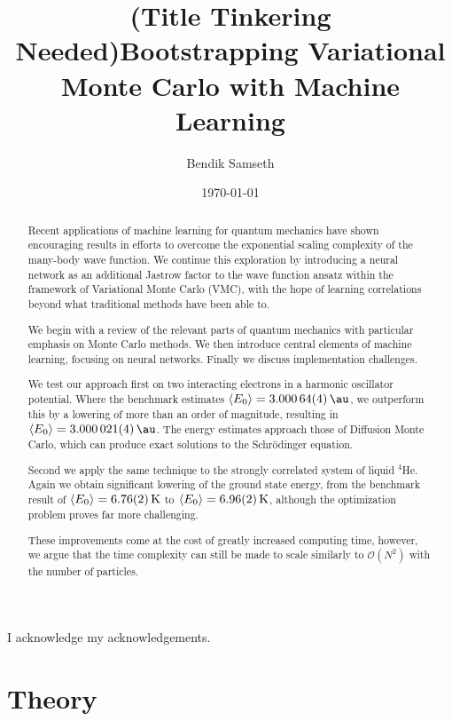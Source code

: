 \documentclass[twoside,english]{uiofysmaster}
\author{Bendik Samseth}
\title{(Title Tinkering Needed)Bootstrapping Variational Monte Carlo with Machine Learning}
\date{\monthyeardate\today}
\begin{document}
\maketitle

\begin{abstract}
Recent applications of machine learning for quantum mechanics have shown
encouraging results in efforts to overcome the exponential scaling complexity of
the many-body wave function. We continue this exploration by introducing a
neural network as an additional Jastrow factor to the wave function ansatz
within the framework of Variational Monte Carlo (VMC), with the hope of learning
correlations beyond what traditional methods have been able to.

We begin with a review of the relevant parts of quantum mechanics with particular
emphasis on Monte Carlo methods. We then introduce central elements of machine
learning, focusing on neural networks. Finally we discuss implementation
challenges.

We test our approach first on two interacting electrons in a harmonic oscillator
potential. Where the benchmark estimates $\expval{E_0}=\SI{3.00064(4)}{\au}$, we
outperform this by a lowering of more than an order of magnitude, resulting in
$\expval{E_0}=\SI{3.000021(4)}{\au}$. The energy estimates approach those of
Diffusion Monte Carlo, which can produce exact solutions to the Schrödinger equation.

Second we apply the same technique to the strongly correlated system of liquid
$^4$He. Again we obtain significant lowering of the ground state energy, from
the benchmark result of $\expval{E_0}=\SI{6.76(2)}{\kelvin}$ to
$\expval{E_0}=\SI{6.96(2)}{\kelvin}$, although the optimization problem proves far
more challenging.

These improvements come at the cost of greatly increased computing time,
however, we argue that the time complexity can still be made to scale similarly to
$\mathcal{O}(N^2)$ with the number of particles.
\end{abstract}

\begin{acknowledgements}
  I acknowledge my acknowledgements.
\end{acknowledgements}

\tableofcontents

\listoffigures

\listoftables



\part{Theory}
\label{prt:theory}





\end{document}
